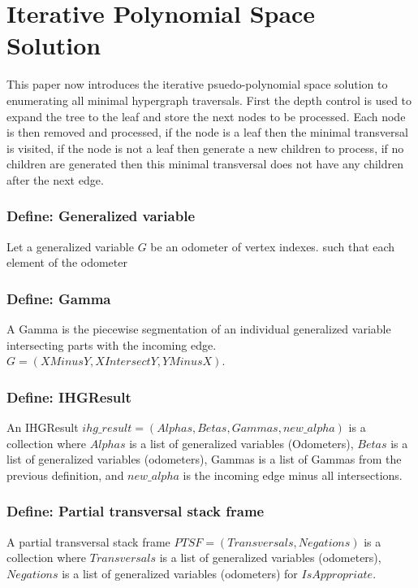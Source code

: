 \chapter{Iterative Polynomial Space Solution}

This paper now introduces the iterative psuedo-polynomial space solution to enumerating all minimal hypergraph traversals. First the depth control is used to expand the tree to the leaf and store the next nodes to be processed. Each node is then removed and processed, if the node is a leaf then the minimal transversal is visited, if the node is not a leaf then generate a new children to process, if no children are generated then this minimal transversal does not have any children after the next edge. 

\subsection{Define: Generalized variable}
Let a generalized variable $G$ be an odometer of vertex indexes.  
such that each element of the odometer 

\subsection{Define: Gamma}
A Gamma is the piecewise segmentation of an individual generalized variable intersecting parts with the incoming edge. $G = (XMinusY, XIntersectY, YMinusX)$.

\subsection{Define: IHGResult }
An IHGResult $ihg\_result = (Alphas,Betas,Gammas,new\_alpha)$ is a collection where $Alphas$ is a list of generalized variables (Odometers), $Betas$ is a list of generalized variables (odometers), Gammas is a list of Gammas from the previous definition, and $new\_alpha$ is the incoming edge minus all 
intersections.

\subsection{Define: Partial transversal stack frame}
A partial transversal stack frame $PTSF = (Transversals,Negations)$ is a collection where $Transversals$ is a list of generalized variables (odometers), $Negations$ is a list of generalized variables (odometers) for $IsAppropriate$.\\

